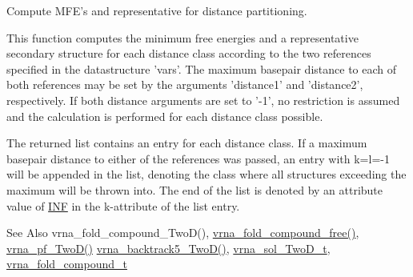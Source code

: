 Compute M\-F\-E's and representative for distance partitioning. 

This function computes the minimum free energies and a representative secondary structure for each distance class according to the two references specified in the datastructure 'vars'. The maximum basepair distance to each of both references may be set by the arguments 'distance1' and 'distance2', respectively. If both distance arguments are set to '-\/1', no restriction is assumed and the calculation is performed for each distance class possible.

The returned list contains an entry for each distance class. If a maximum basepair distance to either of the references was passed, an entry with k=l=-\/1 will be appended in the list, denoting the class where all structures exceeding the maximum will be thrown into. The end of the list is denoted by an attribute value of \hyperlink{energy__const_8h_a12c2040f25d8e3a7b9e1c2024c618cb6}{I\-N\-F} in the k-\/attribute of the list entry.

\begin{DoxySeeAlso}{See Also}
vrna\-\_\-fold\-\_\-compound\-\_\-\-Two\-D(), \hyperlink{group__fold__compound_gadded6039d63f5d6509836e20321534ad}{vrna\-\_\-fold\-\_\-compound\-\_\-free()}, \hyperlink{group__kl__neighborhood__pf_ga0bc3427689bd09da09b8b3094a27f836}{vrna\-\_\-pf\-\_\-\-Two\-D()} \hyperlink{group__kl__neighborhood__mfe_ga15a96fc96f4f4c2e01a11b3e17d1ef43}{vrna\-\_\-backtrack5\-\_\-\-Two\-D()}, \hyperlink{group__kl__neighborhood__mfe_structvrna__sol__TwoD__t}{vrna\-\_\-sol\-\_\-\-Two\-D\-\_\-t}, \hyperlink{group__fold__compound_ga1b0cef17fd40466cef5968eaeeff6166}{vrna\-\_\-fold\-\_\-compound\-\_\-t}
\end{DoxySeeAlso}

